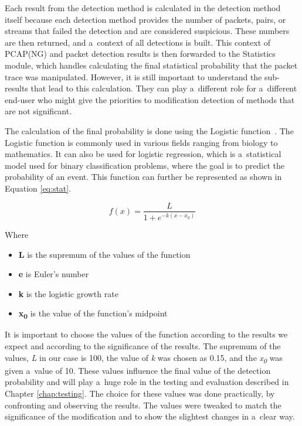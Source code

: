 \documentclass[
  printed,     %
  color,       %
  oneside,     %
  nosansbold,  %
  nocolorbold, %
  nolof,         %
  nolot,         %
]{fithesis4}
\begin{document}
Each result from the detection method is calculated in the detection method itself because each detection method provides the number of packets, pairs, or streams that failed the detection and are considered suspicious. These numbers are then returned, and a~context of all detections is built. This context of PCAP(NG) and packet detection results is then forwarded to the Statistics module, which handles calculating the final statistical probability that the packet trace was manipulated. However, it is still important to understand the sub-results that lead to this calculation. They can play a~different role for a~different end-user who might give the priorities to modification detection of methods that are not significant.

The calculation of the final probability is done using the Logistic function~\cite{doi:10.1021/j150299a014}. The Logistic function is commonly used in various fields ranging from biology to mathematics. It can also be used for logistic regression, which is a~statistical model used for binary classification problems, where the goal is to predict the probability of an event. This function can further be represented as shown in Equation \ref{eq:stat}.

\begin{equation}
\label{eq:stat}
f(x) = \frac{L}{1 + e^{-k(x - x_{0})}}
\end{equation}

Where 

\begin{itemize}[noitemsep,topsep=0pt]
    \item \textbf{L} is the supremum of the values of the function
    \item \textbf{e} is Euler's number
    \item \textbf{k} is the logistic growth rate
    \item \textbf{x\textsubscript{0}} is the value of the function's midpoint
\end{itemize}

It is important to choose the values of the function according to the results we expect and according to the significance of the results. The supremum of the values, \textit{L} in our case is 100, the value of \textit{k} was chosen as 0.15, and the \textit{x\textsubscript{0}} was given a~value of 10. These values influence the final value of the detection probability and will play a~huge role in the testing and evaluation described in Chapter \ref{chap:testing}. The choice for these values was done practically, by confronting and observing the results. The values were tweaked to match the significance of the modification and to show the slightest changes in a~clear way.
\end{document}

